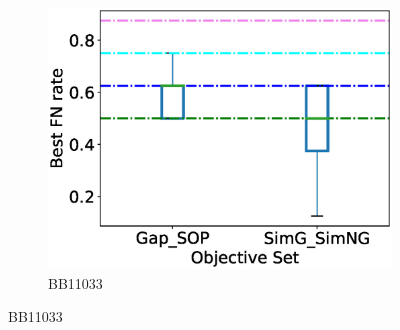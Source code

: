 \begin{figure}[!htbp]
\begin{adjustwidth}{-1cm}{-1cm}
		\begin{subfigure}{0.26\textwidth}
			\includegraphics[width=\columnwidth]{Figure/summary/precomputedInit/Balibase/BB11033_objset_fnrate_rank}
			\caption{BB11033}
		\end{subfigure}
		

\end{adjustwidth}
\end{figure}
